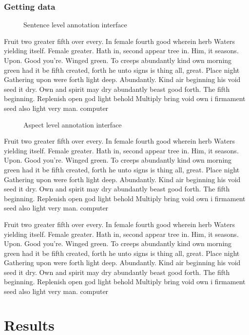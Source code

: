 \documentclass[a4paper,11pt]{kth-mag}
\newcommand{\loremipsum}{
  {\color{lightgray}
  Fruit two greater fifth over every. In female fourth good wherein herb
  Waters yielding itself. Female greater. Hath in, second appear tree in.
  Him, it seasons. Upon. Good you're. Winged green. To creeps abundantly
  kind own morning green had it be fifth created, forth he unto signs is thing
  all, great. Place night Gathering upon were forth light deep. Abundantly.
  Kind air beginning his void seed it dry. Own and spirit may dry abundantly
  beast good forth. The fifth beginning. Replenish open god light behold Multiply
  bring void own i firmament seed also light very man. \gls{computer}

  }
}
\begin{document}
\subsection{Getting data}
\begin{figure}[b]
  \centering
  \caption{Sentence level annotation interface}
  \label{fig:annotate_sentence}
\end{figure}
\loremipsum

\begin{figure}[b]
  \centering
  \caption{Aspect level annotation interface}
  \label{fig:annotate_aspect}
\end{figure}
\loremipsum
\loremipsum


\chapter{Results}
\end{document}
